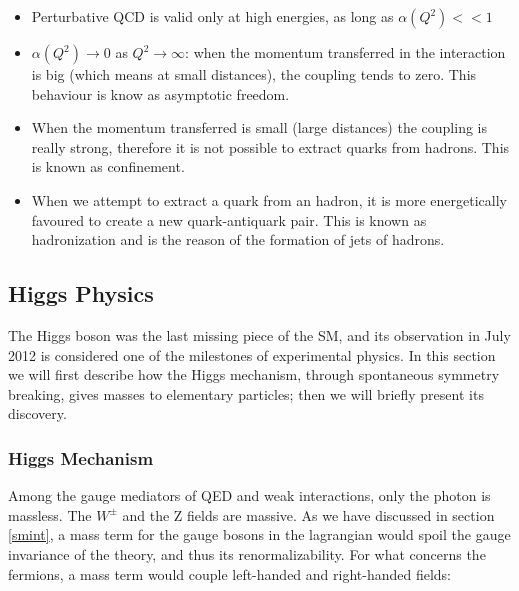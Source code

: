 \begin{itemize}
\item Perturbative QCD is valid only at high energies, as long as $\alpha(Q^2) << 1$
\item $\alpha(Q^2) \rightarrow 0$ as $Q^2 \rightarrow \infty $: when the momentum transferred in the interaction is big (which means at small distances), the coupling tends to zero. This behaviour is know as asymptotic freedom.
\item When the momentum transferred is small (large distances) the coupling is really strong, therefore it is not possible to extract quarks from hadrons. This is known as confinement. 
\item When we attempt to extract a quark from an hadron, it is more energetically favoured to create a new quark-antiquark pair. This is known as hadronization and is the reason of the formation of jets of hadrons.
\end{itemize}





\subsection{Higgs Physics}
\label{sec:H}

The Higgs boson was the last missing piece of the SM, and its observation in July 2012 is considered one of the milestones of experimental physics. In this section we will first describe how the Higgs mechanism, through spontaneous symmetry breaking, gives masses to elementary particles; then we will briefly present its discovery.

\subsubsection{Higgs Mechanism}

Among the gauge mediators of QED and weak interactions, only the photon is massless. The $W^\pm$ and the Z fields are massive. As we have discussed in section \ref{smint}, a mass term for the gauge bosons in the lagrangian would spoil the gauge invariance of the theory, and thus its renormalizability. For what concerns the fermions, a mass term would couple left-handed and right-handed fields: 


